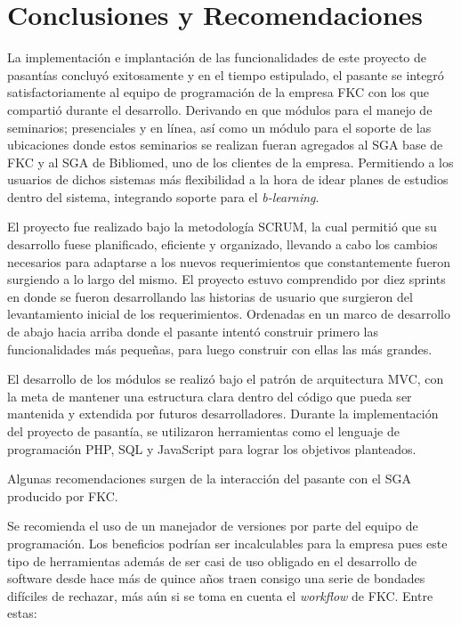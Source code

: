 \chapter*{Conclusiones y Recomendaciones}
\thispagestyle{empty} %
 

La implementación e implantación de las funcionalidades de este proyecto de pasantías concluyó exitosamente y en el tiempo estipulado, el pasante se integró satisfactoriamente al equipo de programación de la empresa FKC con los que compartió durante el desarrollo. Derivando en que módulos para el manejo de seminarios; presenciales y en línea, así como un módulo para el soporte de las ubicaciones donde estos seminarios se realizan fueran agregados al SGA base de FKC y al SGA de Bibliomed, uno de los clientes de la empresa. Permitiendo a los usuarios de dichos sistemas más flexibilidad a la hora de idear planes de estudios dentro del sistema, integrando soporte para el \emph{b-learning}.

El proyecto fue realizado bajo la metodología SCRUM, la cual permitió que su desarrollo fuese planificado, eficiente y organizado, llevando a cabo los cambios necesarios para adaptarse a los nuevos requerimientos que constantemente fueron surgiendo a lo largo del mismo. El proyecto estuvo comprendido por diez sprints en donde se fueron desarrollando las historias de usuario que surgieron del levantamiento inicial de los requerimientos. Ordenadas en un marco de desarrollo de abajo hacia arriba donde el pasante intentó construir primero las funcionalidades más pequeñas, para luego construir con ellas las más grandes.

El desarrollo de los módulos se realizó bajo el patrón de arquitectura MVC, con la meta de mantener una estructura clara dentro del código que pueda ser mantenida y extendida por futuros desarrolladores. Durante la implementación del proyecto de pasantía, se utilizaron herramientas como el lenguaje de programación PHP, \gls{SQL} y JavaScript para lograr los objetivos planteados.

Algunas recomendaciones surgen de la interacción del pasante con el SGA producido por FKC.

Se recomienda el uso de un manejador de versiones por parte del equipo de programación. Los beneficios podrían ser incalculables para la empresa pues este tipo de herramientas además de ser casi de uso obligado en el desarrollo de software desde hace más de quince años traen consigo una serie de bondades difíciles de rechazar, más aún si se toma en cuenta el \emph{workflow} de FKC. Entre estas:


